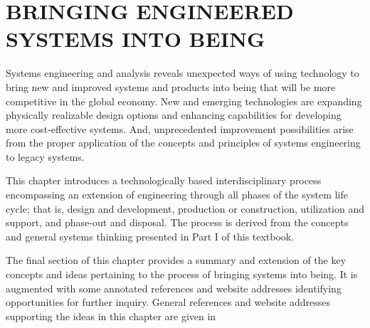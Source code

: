 \chapter{BRINGING ENGINEERED SYSTEMS INTO BEING}\label{chap:06}

Systems engineering and analysis reveals unexpected ways of using technology to bring new and improved systems and products into being that will be more competitive in the global economy. New and emerging technologies are expanding physically realizable design options and enhancing capabilities for developing more cost-effective systems. And, unprecedented improvement possibilities arise from the proper application of the concepts and principles of systems engineering to legacy systems.

This chapter introduces a technologically based interdisciplinary process encompassing an extension of engineering through all phases of the system life cycle; that is, design and development, production or construction, utilization and support, and phase-out and disposal. The process is derived from the concepts and general systems thinking presented in Part I of this textbook.

The final section of this chapter provides a summary and extension of the key concepts and ideas pertaining to the process of bringing systems into being. It is augmented with some annotated references and website addresses identifying opportunities for further inquiry. General references and website addresses supporting the ideas in this chapter are given in 









